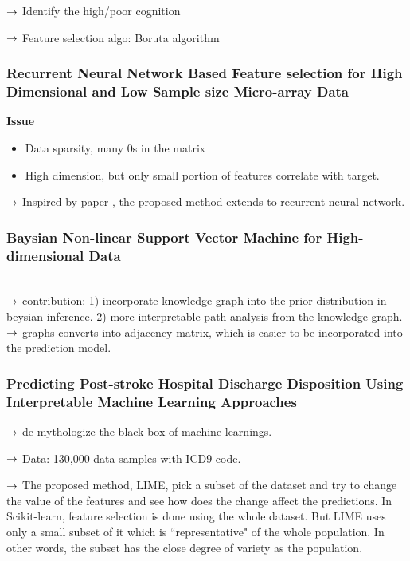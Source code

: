 $\rightarrow$ Identify the high/poor cognition

$\rightarrow$ Feature selection algo: Boruta algorithm \cite{kursa2010feature}

\subsubsection{Recurrent Neural Network Based Feature selection for High Dimensional and Low Sample size Micro-array Data}

{\bf Issue}
\begin{itemize}
    \item Data sparsity, many 0s in the matrix
    \item High dimension, but only small portion of features correlate with target.
\end{itemize}

$\rightarrow$ Inspired by paper \cite{liu2017deep}, the proposed method extends to recurrent neural network.

\subsubsection{Baysian Non-linear Support Vector Machine for High-dimensional Data}

\\

$\rightarrow$ contribution: 1) incorporate knowledge graph into the prior distribution in beysian inference. 2) more interpretable path analysis from the knowledge graph.\\

$\rightarrow$ graphs converts into adjacency matrix, which is easier to be incorporated into the prediction model.\\

\subsubsection{Predicting Post-stroke Hospital Discharge Disposition Using Interpretable Machine Learning Approaches}

$\rightarrow$ de-mythologize the black-box of machine learnings.

$\rightarrow$ Data: 130,000 data samples with ICD9 code.

$\rightarrow$ The proposed method, LIME, pick a subset of the dataset and try to change the value of the features and see how does the change affect the predictions. In Scikit-learn, feature selection is done using the whole dataset. But LIME uses only a small subset of it which is ``representative" of the whole population. In other words, the subset has the close degree of variety as the population.

